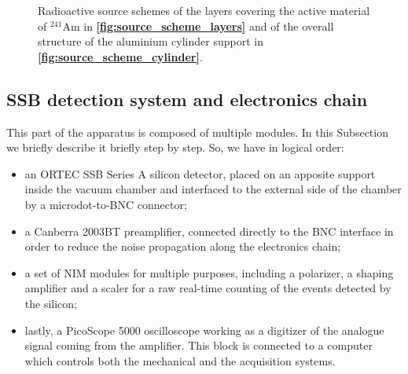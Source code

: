 \documentclass[../../main/main.tex]{subfiles}
\begin{document}
\begin{figure}[h]
    \begin{minipage}[c]{0.49\linewidth}
        \vspace{0pt}
        \centering
    \end{minipage}
    \hfill
    \begin{minipage}[c]{0.49\linewidth}
        \vspace{0pt}
        \centering
    \end{minipage}
    \label{fig:source_scheme}
    \caption{Radioactive source schemes of the layers covering the active material of \( {}^{241}\mathrm{Am} \) in \textbf{\ref{fig:source_scheme_layers}} and of the overall structure of the aluminium cylinder support in \textbf{\ref{fig:source_scheme_cylinder}}.}
\end{figure}





\subsection{SSB detection system and electronics chain}
This part of the apparatus is composed of multiple modules. In this Subsection we briefly describe it briefly step by step. So, we have in logical order:
\begin{itemize}
    \item an ORTEC SSB Series A silicon detector, placed on an apposite support inside the vacuum chamber and interfaced to the external side of the chamber by a microdot-to-BNC connector;
    \item a Canberra 2003BT preamplifier, connected directly to the BNC interface in order to reduce the noise propagation along the electronics chain;
    \item a set of NIM modules for multiple purposes, including a polarizer, a shaping amplifier and a scaler for a raw real-time counting of the events detected by the silicon;
    \item lastly, a PicoScope 5000 oscilloscope working as a digitizer of the analogue signal coming from the amplifier. This block is connected to a computer which controls both the mechanical and the acquisition systems.
\end{itemize}
\end{document}
